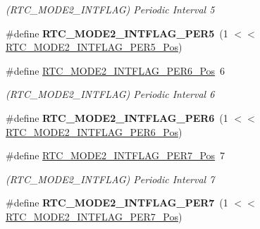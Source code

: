 \begin{DoxyCompactItemize}
\begin{DoxyCompactList}\small\item\em (R\+T\+C\+\_\+\+M\+O\+D\+E2\+\_\+\+I\+N\+T\+F\+L\+A\+G) Periodic Interval 5 \end{DoxyCompactList}\item 
\hypertarget{group___s_a_m_l21___r_t_c_ga72d180acd1761bc1da9aa9161f13b28f}{}\#define {\bfseries R\+T\+C\+\_\+\+M\+O\+D\+E2\+\_\+\+I\+N\+T\+F\+L\+A\+G\+\_\+\+P\+E\+R5}~(1 $<$$<$ \hyperlink{group___s_a_m_l21___r_t_c_ga7fd069649370679c5ed1e874deee5893}{R\+T\+C\+\_\+\+M\+O\+D\+E2\+\_\+\+I\+N\+T\+F\+L\+A\+G\+\_\+\+P\+E\+R5\+\_\+\+Pos})\label{group___s_a_m_l21___r_t_c_ga72d180acd1761bc1da9aa9161f13b28f}

\item 
\hypertarget{group___s_a_m_l21___r_t_c_ga2cd12dd005f413de2450653e0d0682db}{}\#define \hyperlink{group___s_a_m_l21___r_t_c_ga2cd12dd005f413de2450653e0d0682db}{R\+T\+C\+\_\+\+M\+O\+D\+E2\+\_\+\+I\+N\+T\+F\+L\+A\+G\+\_\+\+P\+E\+R6\+\_\+\+Pos}~6\label{group___s_a_m_l21___r_t_c_ga2cd12dd005f413de2450653e0d0682db}

\begin{DoxyCompactList}\small\item\em (R\+T\+C\+\_\+\+M\+O\+D\+E2\+\_\+\+I\+N\+T\+F\+L\+A\+G) Periodic Interval 6 \end{DoxyCompactList}\item 
\hypertarget{group___s_a_m_l21___r_t_c_ga20e64e0d793d89757ef204301787825e}{}\#define {\bfseries R\+T\+C\+\_\+\+M\+O\+D\+E2\+\_\+\+I\+N\+T\+F\+L\+A\+G\+\_\+\+P\+E\+R6}~(1 $<$$<$ \hyperlink{group___s_a_m_l21___r_t_c_ga2cd12dd005f413de2450653e0d0682db}{R\+T\+C\+\_\+\+M\+O\+D\+E2\+\_\+\+I\+N\+T\+F\+L\+A\+G\+\_\+\+P\+E\+R6\+\_\+\+Pos})\label{group___s_a_m_l21___r_t_c_ga20e64e0d793d89757ef204301787825e}

\item 
\hypertarget{group___s_a_m_l21___r_t_c_ga621b2f70fc06d8fd37d1f977bbc601b7}{}\#define \hyperlink{group___s_a_m_l21___r_t_c_ga621b2f70fc06d8fd37d1f977bbc601b7}{R\+T\+C\+\_\+\+M\+O\+D\+E2\+\_\+\+I\+N\+T\+F\+L\+A\+G\+\_\+\+P\+E\+R7\+\_\+\+Pos}~7\label{group___s_a_m_l21___r_t_c_ga621b2f70fc06d8fd37d1f977bbc601b7}

\begin{DoxyCompactList}\small\item\em (R\+T\+C\+\_\+\+M\+O\+D\+E2\+\_\+\+I\+N\+T\+F\+L\+A\+G) Periodic Interval 7 \end{DoxyCompactList}\item 
\hypertarget{group___s_a_m_l21___r_t_c_gafd7624624bfab019d77c7a51aae40a96}{}\#define {\bfseries R\+T\+C\+\_\+\+M\+O\+D\+E2\+\_\+\+I\+N\+T\+F\+L\+A\+G\+\_\+\+P\+E\+R7}~(1 $<$$<$ \hyperlink{group___s_a_m_l21___r_t_c_ga621b2f70fc06d8fd37d1f977bbc601b7}{R\+T\+C\+\_\+\+M\+O\+D\+E2\+\_\+\+I\+N\+T\+F\+L\+A\+G\+\_\+\+P\+E\+R7\+\_\+\+Pos})\label{group___s_a_m_l21___r_t_c_gafd7624624bfab019d77c7a51aae40a96}


\end{DoxyCompactItemize}
